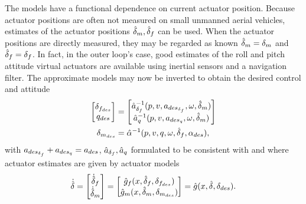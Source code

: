 The models have a functional dependence on current actuator position. Because actuator positions are often not measured on small unmanned aerial vehicles, estimates of the actuator positions $\hat{\delta}_m, \hat{\delta}_f$
can be used. When the actuator positions are directly
measured, they may be regarded as known $\hat{\delta}_m = \delta_m$ and $\hat{\delta}_f
= \delta_f$. In fact, in the outer loop's case, good estimates of the roll and pitch attitude virtual actuators are
available using inertial sensors and a navigation filter.
%
The approximate models may now be inverted to obtain the desired control and attitude
%
\begin{equation}
\begin{split}
\label{e:inverselaw}
\begin{bmatrix}
\delta_{f_{des}} \\
q_{des}
\end{bmatrix}
&=
\begin{bmatrix}
\hat{a}_{\delta_f}^{-1}(p,v,a_{des_{\delta_f}},\omega,\hat{\delta}_m)\\
\hat{a}_{q}^{-1}(p,v,a_{des_{q}},\omega,\hat{\delta}_m)
\end{bmatrix}  \\
\delta_{m_{des}} &= \hat{\alpha}^{-1}(p,v,q,\omega,\hat{\delta}_f,\alpha_{des}),
\end{split}
\end{equation}
with $a_{des_{\delta_f}}+a_{des_{q}} = a_{des}$, $\hat{a}_{\delta_f},\hat{a}_{q}$
formulated to be consistent with  and where
actuator estimates are given by actuator models
\begin{equation}\label{e:ghat} \dot{\hat{\delta}} =
\begin{bmatrix}
\dot{\hat{\delta}}_f \\
\dot{\hat{\delta}}_m
\end{bmatrix}
=
\begin{bmatrix}
\hat{g}_f(x,\hat{\delta}_f,\delta_{f_{des}})\\
\hat{g}_m(x,\hat{\delta}_m,\delta_{m_{des}})
\end{bmatrix}
= \hat{g}(x,\hat{\delta},\delta_{des}).
\end{equation}
%

